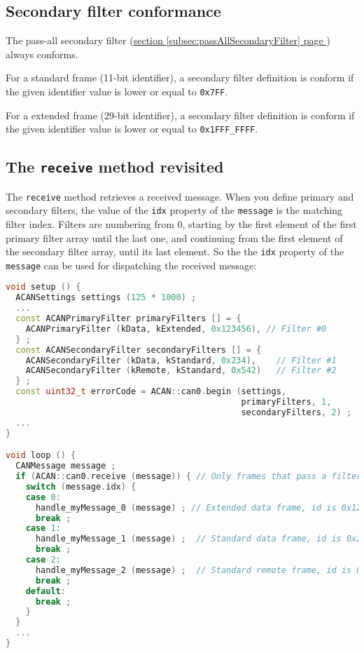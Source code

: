 \documentclass[10pt, a4paper, obeyspaces, openany]{extarticle}
\newcommand \subsectionLabel[2]{\subsection{#1}\label{subsec:#2}}
\newcommand\refSubsectionPage[1]{\hyperref[subsec:#1]{section \ref*{subsec:#1} page \pageref{subsec:#1}}}
\begin{document}
\subsectionLabel{Secondary filter conformance}{secondaryFilterConformance}

The pass-all secondary filter (\refSubsectionPage{passAllSecondaryFilter}) always conforms.

For a standard frame (11-bit identifier), a secondary filter definition is conform if the given identifier value is lower or equal to \texttt{0x7FF}.

For a extended frame (29-bit identifier), a secondary filter definition is conform if the given identifier value is lower or equal to \texttt{0x1FFF\_FFFF}.




\subsectionLabel{The \texttt{receive} method revisited}{usingIDXvalueWithSecondaryFilter}

The \texttt{receive} method retrieves a received message. When you define primary and secondary filters, the value of the \texttt{idx} property of the \texttt{message} is the matching filter index. Filters are numbering from 0, starting by the first element of the first primary filter array until the last one, and continuing from the first element of the secondary filter array, until its last element. So the the \texttt{idx} property  of the \texttt{message} can be used for dispatching the received message:

{ \small\begin{lstlisting}[language=c++]
void setup () {
  ACANSettings settings (125 * 1000) ;
  ...
  const ACANPrimaryFilter primaryFilters [] = {
    ACANPrimaryFilter (kData, kExtended, 0x123456), // Filter #0
  } ;
  const ACANSecondaryFilter secondaryFilters [] = {
    ACANSecondaryFilter (kData, kStandard, 0x234),    // Filter #1
    ACANSecondaryFilter (kRemote, kStandard, 0x542)   // Filter #2
  } ;
  const uint32_t errorCode = ACAN::can0.begin (settings,
                                               primaryFilters, 1,
                                               secondaryFilters, 2) ;
  ...
}

void loop () {
  CANMessage message ;
  if (ACAN::can0.receive (message)) { // Only frames that pass a filter are retrieved
    switch (message.idx) {
    case 0:
      handle_myMessage_0 (message) ; // Extended data frame, id is 0x123456
      break ;
    case 1:
      handle_myMessage_1 (message) ;  // Standard data frame, id is 0x234
      break ;
    case 2:
      handle_myMessage_2 (message) ;  // Standard remote frame, id is 0x542
      break ;
    default:
      break ;
    }
  }
  ...
}
\end{lstlisting}}
\end{document}
